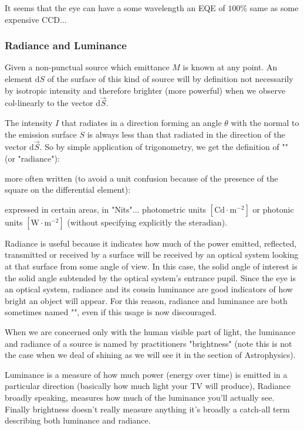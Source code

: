	\begin{tcolorbox}[title=Remark,colframe=black,arc=10pt]
	It seems that the eye can have a some wavelength an EQE of $100\%$ same as some expensive CCD...
	\end{tcolorbox}
	
	\subsubsection{Radiance and Luminance}\label{radiance and luminance}
	Given a non-punctual source which emittance $M$ is known at any point. An element $\mathrm{d}S$ of the surface of this kind of source will by definition not necessarily by isotropic intensity and therefore brighter (more powerful) when we observe col-linearly to the vector $\mathrm{d}\vec{S}$.
	
	The intensity $I$ that radiates in a direction forming an angle $\theta$ with the normal to the emission surface $S$ is always less than that radiated in the direction of the vector $\mathrm{d}\vec{S}$. So by simple application of trigonometry, we get the definition of "" (or "radiance"):
	
	more often written (to avoid a unit confusion because of the presence of the square on the differential element):
	
	expressed in certain areas, in "Nits"... photometric units  $[\text{Cd}\cdot\text{m}^{-2}]$ or photonic units $[\text{W}\cdot\text{m}^{-2}]$ (without specifying explicitly the steradian).
	
	Radiance is useful because it indicates how much of the power emitted, reflected, transmitted or received by a surface will be received by an optical system looking at that surface from some angle of view. In this case, the solid angle of interest is the solid angle subtended by the optical system's entrance pupil. Since the eye is an optical system, radiance and its cousin luminance are good indicators of how bright an object will appear. For this reason, radiance and luminance are both sometimes named "", even if this usage is now discouraged.
	\begin{tcolorbox}[title=Remark,colframe=black,arc=10pt]
	When we are concerned only with the human visible part of light, the luminance and radiance of a source is named by practitioners "brightness" (note this is not the case when we deal of shining as we will see it in the section of Astrophysics).
	\end{tcolorbox}	
	Luminance is a measure of how much power (energy over time) is emitted in a particular direction (basically how much light your TV will produce), Radiance broadly speaking, measures how much of the luminance you'll actually see. Finally brightness doesn't really measure anything it's broadly a catch-all term describing both luminance and radiance.
	

